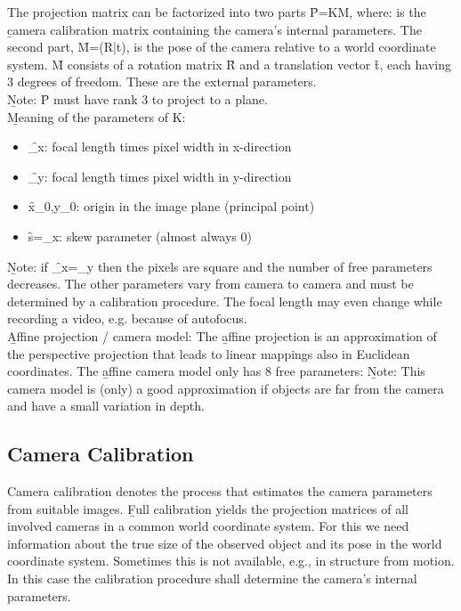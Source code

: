 The projection matrix can be factorized into two parts \f{P=KM}, where:
is the \b{camera calibration matrix} containing the camera's internal parameters. The second part, \f{M=(R|t)}, is the pose of the camera relative to a world coordinate system. \f{M} consists of a rotation matrix \f{R} and a translation vector \f{t}, each having 3 degrees of freedom. These are the external parameters.\\

\b{Note:} \f{P} must have rank 3 to project to a plane.\\

\b{Meaning of the parameters of K:}
\begin{itemize}
    \item \f{\alpha_x}: focal length times pixel width in x-direction
    \item \f{\alpha_y}: focal length times pixel width in y-direction
    \item \f{x_0,y_0}: origin in the image plane (principal point)
    \item \f{s=\alpha_x\cos\phi}: skew parameter (almost always 0)
\end{itemize}
\newpage
\b{Note:} if \f{\alpha_x=\alpha_y} then the pixels are square and the number of free parameters decreases. The other parameters vary from camera to camera and must be determined by a calibration procedure. The focal length may even change while recording a video, e.g. because of autofocus.\\

\b{Affine projection / camera model:}
The \b{affine projection} is an approximation of the perspective projection that leads to linear mappings also in Euclidean coordinates. The \b{affine camera model} only has 8 free parameters:
\b{Note:} This camera model is (only) a good approximation if objects are far from the camera and have a small variation in depth.


\subsection{Camera Calibration}
Camera calibration denotes the process that estimates the camera parameters from suitable images. \b{Full calibration} yields the projection matrices of all involved cameras in a common world coordinate system. For this we need information about the true size of the observed object and its pose in the world coordinate system. Sometimes this is not available, e.g., in structure from motion. In this case the calibration procedure shall determine the camera's internal parameters.\\


